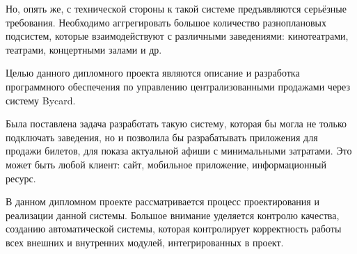 Но, опять же, с технической стороны к такой системе предъявляются серьёзные требования. Необходимо аггрегировать большое количество разноплановых подсистем, которые взаимодействуют с различными заведениями: кинотеатрами, театрами, концертными залами и др. 

Целью данного дипломного проекта являются описание и разработка программного обеспечения по управлению централизованными продажами через систему Bycard.

Была поставлена задача разработать такую систему, которая бы могла не только подключать заведения, но и позволила бы разрабатывать приложения для продажи билетов, для показа актуальной афиши с минимальными затратами. Это может быть любой клиент: сайт, мобильное приложение, информационный ресурс.

В данном дипломном проекте рассматривается процесс проектирования и реализации данной системы. Большое внимание уделяется контролю качества, созданию автоматической системы, которая контролирует корректность работы всех внешних и внутренних модулей, интегрированных в проект.

\newpage
